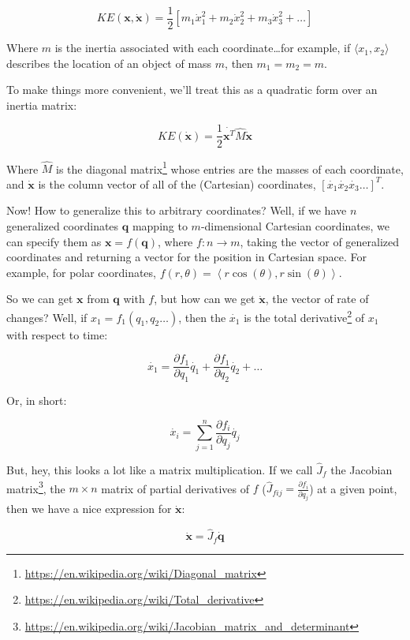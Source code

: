 \documentclass[]{article}
\renewcommand{\href}[2]{#2\footnote{\url{#1}}}
\begin{document}
\[
KE(\mathbf{x}, \dot{\mathbf{x}}) = \frac{1}{2} \left[ m_1 \dot{x}_1^2 + m_2 \dot{x}_2^2 + m_3 \dot{x}_3^2 + \dots \right]
\]

Where \(m\) is the inertia associated with each coordinate\ldots{}for example,
if \(\langle x_1, x_2 \rangle\) describes the location of an object of mass
\(m\), then \(m_1 = m_2 = m\).

To make things more convenient, we'll treat this as a quadratic form over an
inertia matrix:

\[
KE(\dot{\mathbf{x}}) = \frac{1}{2} \dot{\mathbf{x}^T} \hat{M} \dot{\mathbf{x}}
\]

Where \(\hat{M}\) is the
\href{https://en.wikipedia.org/wiki/Diagonal_matrix}{diagonal matrix} whose
entries are the masses of each coordinate, and \(\dot{\mathbf{x}}\) is the
column vector of all of the (Cartesian) coordinates,
\(\left[ \dot{x_1} \dot{x_2} \dot{x_3} \dots \right]^T\).

Now! How to generalize this to arbitrary coordinates? Well, if we have \(n\)
generalized coordinates \(\mathbf{q}\) mapping to \(m\)-dimensional Cartesian
coordinates, we can specify them as \(\mathbf{x} = f(\mathbf{q})\), where
\(f : n \rightarrow m\), taking the vector of generalized coordinates and
returning a vector for the position in Cartesian space. For example, for polar
coordinates,
\(f(r, \theta) = \left \langle r \cos(\theta), r \sin(\theta) \right \rangle\).

So we can get \(\mathbf{x}\) from \(\mathbf{q}\) with \(f\), but how can we get
\(\dot{\mathbf{x}}\), the vector of rate of changes? Well, if
\(x_1 = f_1(q_1, q_2 \dots)\), then the \(\dot{x_1}\) is the
\href{https://en.wikipedia.org/wiki/Total_derivative}{total derivative} of
\(x_1\) with respect to time:

\[
\dot{x_1} = \frac{\partial f_1}{\partial q_1} \dot{q_1} +
    \frac{\partial f_1}{\partial q_2} \dot{q_2} + \dots
\]

Or, in short:

\[
\dot{x_i} = \sum_{j = 1}^n \frac{\partial f_i}{\partial q_j} \dot{q_j}
\]

But, hey, this looks a lot like a matrix multiplication. If we call
\(\hat{J}_f\) the
\href{https://en.wikipedia.org/wiki/Jacobian_matrix_and_determinant}{Jacobian
matrix}, the \(m \times n\) matrix of partial derivatives of \(f\)
(\(\hat{J}_{fij} = \frac{\partial f_i}{\partial q_j}\)) at a given point, then
we have a nice expression for \(\dot{\mathbf{x}}\):

\[
\dot{\mathbf{x}} = \hat{J}_f \dot{\mathbf{q}}
\]
\end{document}
